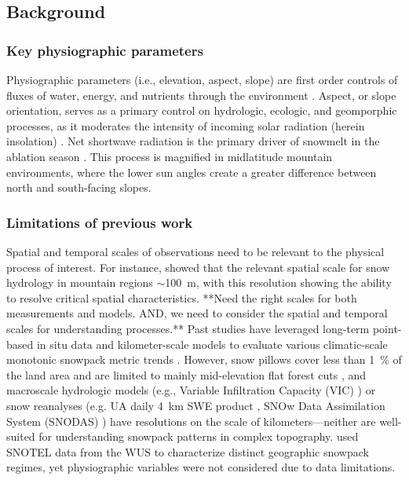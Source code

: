 % 
\subsection{Background}
\subsubsection{Key physiographic parameters}
Physiographic parameters (i.e., elevation, aspect, slope) are first order controls of fluxes of water, energy, and nutrients through the environment \citep{pelletierWhichWayYou2018a}. Aspect, or slope orientation, serves as a primary control on hydrologic, ecologic, and geomporphic processes, as it moderates the intensity of incoming solar radiation (herein insolation) \citep{broxtonRoleAspectQuantify2009}. Net shortwave radiation is the primary driver of snowmelt in the ablation season \citep{marksClimateEnergyExchange1992a}. This process is magnified in midlatitude mountain environments, where the lower sun angles create a greater difference between north and south-facing slopes. 

\subsubsection{Limitations of previous work}
Spatial and temporal scales of observations need to be relevant to the physical process of interest. For instance, \cite{bloschlScalingIssuesSnow1999} showed that the relevant spatial scale for snow hydrology in mountain regions $\sim$100~m, with this resolution showing the ability to resolve critical spatial characteristics. **Need the right scales for both measurements and models.  AND, we need to consider the spatial and temporal scales for understanding processes.** Past studies have leveraged long-term point-based in situ data \citep{clowChangesTimingSnowmelt2010,harpoldChangesSnowpackAccumulation2012a,kapnickCausesRecentChanges2012,musselmanWinterMeltTrends2021} and kilometer-scale models to evaluate various climatic-scale monotonic snowpack metric trends 
\citep{moteDECLININGMOUNTAINSNOWPACK2005, moteDramaticDeclinesSnowpack2018, zengSnowpackChange19822018, haleDriversSpatiotemporalPatterns2023}. However, snow pillows cover less than 1~\% of the land area and are limited to mainly mid-elevation flat forest cuts \citep{guan20102011Snow2013}, and macroscale hydrologic models (e.g., Variable Infiltration Capacity (VIC) \citep{liangSimpleHydrologicallyBased1994}) or snow reanalyses (e.g. UA daily 4~km SWE product \citep{broxtonLinkingSnowfallSnow2016}, SNOw Data Assimilation System (SNODAS) \citep{barrettNationalOperationalHydrologic2003}) have resolutions on the scale of kilometers---neither are well-suited for understanding snowpack patterns in complex topography. \cite{trujilloSnowpackRegimesWestern2014} used SNOTEL data from the WUS to characterize distinct geographic snowpack regimes, yet physiographic variables were not considered due to data limitations.

